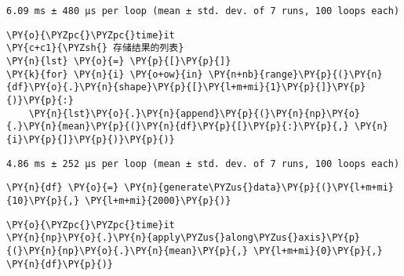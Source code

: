     \begin{Verbatim}[commandchars=\\\{\}]
6.09 ms ± 480 µs per loop (mean ± std. dev. of 7 runs, 100 loops each)
    \end{Verbatim}

    \begin{tcolorbox}[breakable, size=fbox, boxrule=1pt, pad at break*=1mm,colback=cellbackground, colframe=cellborder]
\begin{Verbatim}[commandchars=\\\{\}]
\PY{o}{\PYZpc{}\PYZpc{}time}it
\PY{c+c1}{\PYZsh{} 存储结果的列表}
\PY{n}{lst} \PY{o}{=} \PY{p}{[}\PY{p}{]}
\PY{k}{for} \PY{n}{i} \PY{o+ow}{in} \PY{n+nb}{range}\PY{p}{(}\PY{n}{df}\PY{o}{.}\PY{n}{shape}\PY{p}{[}\PY{l+m+mi}{1}\PY{p}{]}\PY{p}{)}\PY{p}{:}
    \PY{n}{lst}\PY{o}{.}\PY{n}{append}\PY{p}{(}\PY{n}{np}\PY{o}{.}\PY{n}{mean}\PY{p}{(}\PY{n}{df}\PY{p}{[}\PY{p}{:}\PY{p}{,} \PY{n}{i}\PY{p}{]}\PY{p}{)}\PY{p}{)}
\end{Verbatim}
\end{tcolorbox}

    \begin{Verbatim}[commandchars=\\\{\}]
4.86 ms ± 252 µs per loop (mean ± std. dev. of 7 runs, 100 loops each)
    \end{Verbatim}

    \begin{tcolorbox}[breakable, size=fbox, boxrule=1pt, pad at break*=1mm,colback=cellbackground, colframe=cellborder]
\begin{Verbatim}[commandchars=\\\{\}]
\PY{n}{df} \PY{o}{=} \PY{n}{generate\PYZus{}data}\PY{p}{(}\PY{l+m+mi}{10}\PY{p}{,} \PY{l+m+mi}{2000}\PY{p}{)}
\end{Verbatim}
\end{tcolorbox}

    \begin{tcolorbox}[breakable, size=fbox, boxrule=1pt, pad at break*=1mm,colback=cellbackground, colframe=cellborder]
\begin{Verbatim}[commandchars=\\\{\}]
\PY{o}{\PYZpc{}\PYZpc{}time}it
\PY{n}{np}\PY{o}{.}\PY{n}{apply\PYZus{}along\PYZus{}axis}\PY{p}{(}\PY{n}{np}\PY{o}{.}\PY{n}{mean}\PY{p}{,} \PY{l+m+mi}{0}\PY{p}{,} \PY{n}{df}\PY{p}{)}
\end{Verbatim}
\end{tcolorbox}

